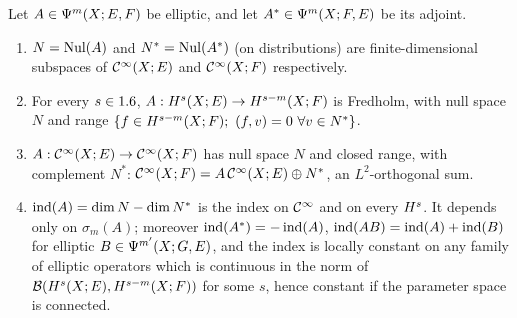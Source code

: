 \begin{theorem}\label{manifolds:thm:fredholm}
Let $A\in\Psi^{m}(X;E,F)$ be elliptic, and let $A^*\in\Psi^{m}(X;F,E)$ be its adjoint.
\begin{enumerate}[label=\textup{(\alph*)}]
\item $N=\operatorname{Nul}(A)$ and $N^*=\operatorname{Nul}(A^*)$ (on distributions) are finite-dimensional
subspaces of $\mathcal{C}^\infty(X;E)$ and $\mathcal{C}^\infty(X;F)$ respectively.
\item For every $s\in1.6$, $A:H^{s}(X;E)\to H^{s-m}(X;F)$ is Fredholm, with null space
$N$ and range $\{f\in\Hs{s-m}(X;F);\ \inner fv=0\ \forall v\in N^*\}$.
\item $A:\mathcal{C}^\infty(X;E)\to\mathcal{C}^\infty(X;F)$ has null space $N$ and closed range, with complement
$N^*$: $\mathcal{C}^\infty(X;F)=A\,\mathcal{C}^\infty(X;E)\oplus N^*$, an $L^2$-orthogonal sum.
\item $\operatorname{ind}(A)=\dim N-\dim N^*$ is the index on $\mathcal{C}^\infty$ and on every $H^{s}$. It
depends only on $\sigma_m(A)$; moreover $\operatorname{ind}(A^*)=-\operatorname{ind}(A)$, $\operatorname{ind}(AB)=\operatorname{ind}(A)+\operatorname{ind}(B)$
for elliptic $B\in\Psi^{m'}(X;G,E)$, and the index is locally constant on any family of
elliptic operators which is continuous in the norm of
$\mathcal{B}(H^{s}(X;E),H^{s-m}(X;F))$ for some $s$, hence constant if the parameter space is
connected.
\end{enumerate}
\end{theorem}
